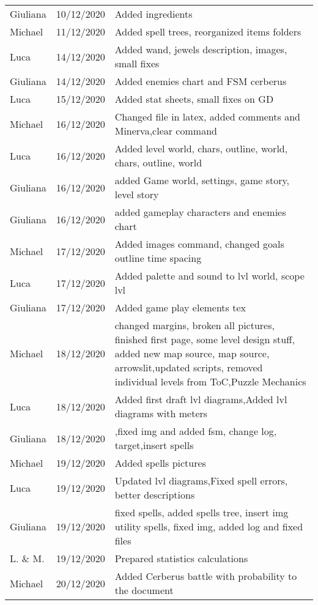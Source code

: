 \begin{longtable}{ m{2cm}m{3cm}m{8cm}}
Giuliana & 10/12/2020 & Added ingredients\\
Michael  & 11/12/2020 & Added spell trees, reorganized items folders\\
Luca     & 14/12/2020 & Added wand, jewels description, images, small fixes \\
Giuliana & 14/12/2020 & Added enemies chart and FSM cerberus\\
Luca     & 15/12/2020 & Added stat sheets, small fixes on GD\\
Michael  & 16/12/2020 & Changed file in latex, added comments and Minerva,clear command \\
Luca     & 16/12/2020 & Added level world, chars, outline, world, chars, outline, world\\
Giuliana & 16/12/2020 & added Game world, settings, game story, level story\\
Giuliana & 16/12/2020 & added gameplay characters and enemies chart\\
Michael  & 17/12/2020 & Added images command, changed goals outline time spacing\\
Luca     & 17/12/2020 & Added palette and sound to lvl world, scope lvl\\
Giuliana & 17/12/2020 & Added game play elements tex\\
Michael  & 18/12/2020 & changed margins, broken all pictures, finished first page, some level design stuff, added new map source, map source, arrowslit,updated scripts, removed individual levels from ToC,Puzzle Mechanics\\
Luca     & 18/12/2020 & Added first draft lvl diagrams,Added lvl diagrams with meters\\
Giuliana & 18/12/2020 & ,fixed img and added fsm, change log, target,insert spells\\
Michael  & 19/12/2020 & Added spells pictures\\
Luca     & 19/12/2020 & Updated lvl diagrams,Fixed spell errors, better descriptions\\
Giuliana & 19/12/2020 & fixed spells, added spells tree, insert img utility spells, fixed img, added log and fixed files\\
L. \& M. & 19/12/2020 & Prepared statistics calculations\\
Michael  & 20/12/2020 & Added Cerberus battle with probability to the document\\
\end{longtable}
\pagebreak
